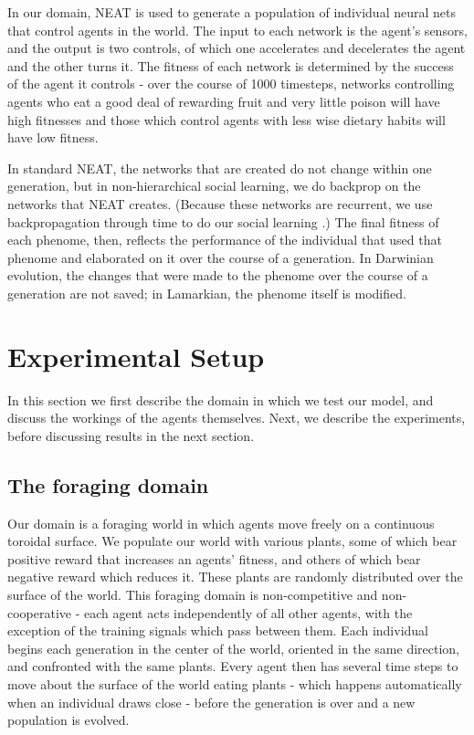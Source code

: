 \documentclass{acm_proc_article-sp}
\begin{document}
In our domain, NEAT is used to generate a population of individual neural nets that control agents in the world.  The input to each network is the agent's sensors, and the output is two controls, of which one accelerates and decelerates the agent and the other turns it.  The fitness of each network is determined by the success of the agent it controls - over the course of 1000 timesteps, networks controlling agents who eat a good deal of rewarding fruit and very little poison will have high fitnesses and those which control agents with less wise dietary habits will have low fitness.

In standard NEAT, the networks that are created do not change within one generation, but in non-hierarchical social learning, we do backprop on the networks that NEAT creates. (Because these networks are recurrent, we use backpropagation through time to do our social learning \cite{werbos1990backpropagation}.)  The final fitness of each phenome, then, reflects the performance of the individual that used that phenome and elaborated on it over the course of a generation. In Darwinian evolution, the changes that were made to the phenome over the course of a generation are not saved; in Lamarkian, the phenome itself is modified.

\section{Experimental Setup}
\label{sec:setup}
In this section we first describe the domain in which we test our model, and discuss the workings of the agents themselves.  Next, we describe the experiments, before discussing results in the next section.
\subsection*{The foraging domain} 
    Our domain is a foraging world in which agents move freely on a continuous toroidal surface.  We populate our world with various plants, some of which bear positive reward that increases an agents' fitness, and others of which bear negative reward which reduces it. These plants are randomly distributed over the surface of the world. This foraging domain is non-competitive and non-cooperative - each agent acts independently of all other agents, with the exception of the training signals which pass between them. Each individual begins each generation in the center of the world, oriented in the same direction, and confronted with the same plants. Every agent then has several time steps to move about the surface of the world eating plants - which happens automatically when an individual draws close - before the generation is over and a new population is evolved. 
    
\end{document}
